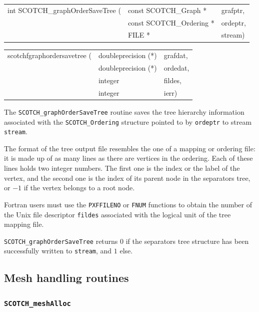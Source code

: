 \begin{itemize}
\progsyn

{\tt\begin{tabular}{l@{}ll}
int SCOTCH\_graphOrderSaveTree ( & const SCOTCH\_Graph *    & grafptr, \\
                                 & const SCOTCH\_Ordering * & ordeptr, \\
                                 & FILE *                   & stream)
\end{tabular}}

{\tt\begin{tabular}{l@{}ll}
scotchfgraphordersavetree ( & doubleprecision (*) & grafdat, \\
                            & doubleprecision (*) & ordedat, \\
                            & integer             & fildes,  \\
                            & integer             & ierr)
\end{tabular}}

\progdes

The {\tt SCOTCH\_graphOrderSaveTree} routine saves the tree
hierarchy information associated with the {\tt SCOTCH\_\lbt Ordering}
structure pointed to by {\tt ordeptr} to stream {\tt stream}.

The format of the tree output file resembles the one of a mapping or
ordering file: it is made up of as many lines as there are vertices in
the ordering. Each of these lines holds two integer numbers. The first
one is the index or the label of the vertex, and the second one is the
index of its parent node in the separators tree, or $-1$ if the vertex
belongs to a root node.

Fortran users must use the {\tt PXFFILENO} or {\tt FNUM} functions to
obtain the number of the Unix file descriptor {\tt fildes} associated
with the logical unit of the tree mapping file.

\progret

{\tt SCOTCH\_graphOrderSaveTree} returns $0$ if the separators tree
structure has been successfully written to {\tt stream}, and $1$ else.
\end{itemize}

\subsection{Mesh handling routines}
\label{sec-lib-mesh}

\subsubsection{{\tt SCOTCH\_meshAlloc}}

